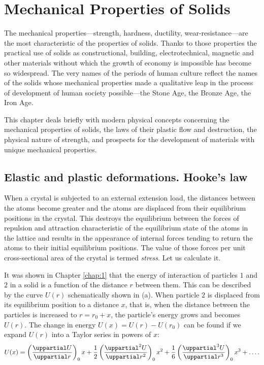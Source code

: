 

\chapter[Mechanical Properties of Solids]{Mechanical Properties of Solids}\label{chap:2}

The mechanical properties---strength, hardness, ductility, wear-resistance---are the most characteristic of the properties of solids. Thanks to those properties the practical use of solids as constructional, building, electrotechnical, magnetic and other materials without which the growth of economy is impossible has become so widespread. The very names of the periods of human culture reflect the names of the solids whose mechanical properties made a qualitative leap in the process of development of human society possible---the Stone Age, the Bronze Age, the Iron Age.

This chapter deals briefly with modern physical concepts concerning the mechanical properties of solids, the laws of their plastic flow and destruction, the physical nature of strength, and prospects for the development of materials with unique mechanical properties.

\section{Elastic and plastic deformations. Hooke's law}\label{sec:13}

When a crystal is subjected to an external extension load, the distances between the atoms become greater and the atoms are displaced from their equilibrium positions in the crystal. This destroys the equilibrium between the forces of repulsion and attraction characteristic of the equilibrium state of the atoms in the lattice and results in the appearance of internal forces tending to return the atoms to their initial equilibrium positions. The value of those forces per unit cross-sectional area of the crystal is termed \textit{stress}. Let us calculate it.

It was shown in Chapter \ref{chap:1} that the energy of interaction of particles $1$ and $2$ in a solid is a function of the distance $r$ between them. This can be described by the curve $U(r)$ schematically shown in (a). When particle $2$ is displaced from its equilibrium position to a distance $x$, that is, when the distance between the particles is increased to $r=r_0+x$, the particle's energy grows and becomes $U(r)$. The change in energy $U(x)=U(r)-U(r_0)$ can be found if we expand $U(r)$ into a Taylor series in powers of $x$:
\begin{equation}\label{eq:2_1}
	U(x) = \parenthesis{\diffpartial{U}{r}}_0 x + \frac{1}{2} \parenthesis{\diffnpartial{U}{r}{2}}_0 x^2 + \frac{1}{6} \parenthesis{\diffnpartial{U}{r}{3}}_0 x^3 + \ldots .
\end{equation}

